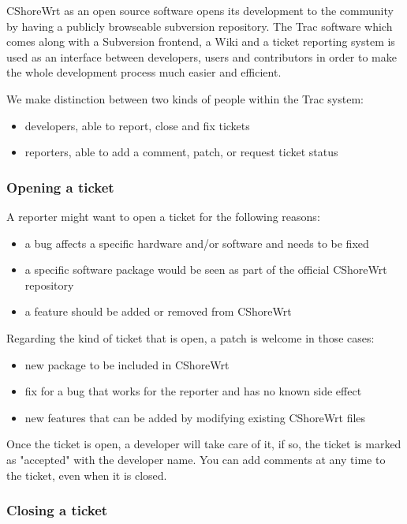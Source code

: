 CShoreWrt as an open source software opens its development to the community by
having a publicly browseable subversion repository. The Trac software which
comes along with a Subversion frontend,  a Wiki and a ticket reporting system 
is used as an interface between developers, users and contributors in order to 
make the whole development process much easier and efficient.

We make distinction between two kinds of people within the Trac system:

\begin{itemize}
\item developers, able to report, close and fix tickets
\item reporters, able to add a comment, patch, or request ticket status
\end{itemize}

\subsubsection{Opening a ticket}

A reporter might want to open a ticket for the following reasons:

\begin{itemize}
\item a bug affects a specific hardware and/or software and needs to be fixed
\item a specific software package would be seen as part of the official CShoreWrt repository
\item a feature should be added or removed from CShoreWrt
\end{itemize}

Regarding the kind of ticket that is open, a patch is welcome in those cases:

\begin{itemize}
\item new package to be included in CShoreWrt
\item fix for a bug that works for the reporter and has no known side effect
\item new features that can be added by modifying existing CShoreWrt files
\end{itemize}

Once the ticket is open, a developer will take care of it, if so, the ticket is marked
as "accepted" with the developer name. You can add comments at any time to the ticket,
even when it is closed.

\subsubsection{Closing a ticket}

